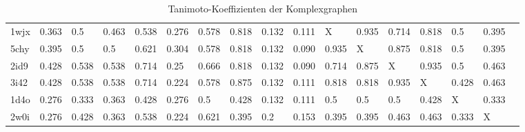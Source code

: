 \documentclass{report}
\begin{document}
\begin{table}
{\begin{tabular}{l l l l l l l l l l l l l l l l l}
1wjx & 0.363 & 0.5 & 0.463 & 0.538 & 0.276 & 0.578 & \cellcolor{fGreen!50}0.818 & 0.132 & 0.111 &   X   & \cellcolor{fGreen!100}0.935 & \cellcolor{fGreen!25}0.714 & \cellcolor{fGreen!75}0.818 & 0.5 & 0.395 &  \\
5chy & 0.395 & 0.5 & 0.5 & 0.621 & 0.304 & 0.578 & \cellcolor{fGreen!25}0.818 & 0.132 & 0.090 & \cellcolor{fGreen!100}0.935 &   X   & \cellcolor{fGreen!75}0.875 & \cellcolor{fGreen!50}0.818 & 0.5 & 0.395 &  \\
2id9 & 0.428 & 0.538 & 0.538 & 0.714 & 0.25 & 0.666 & \cellcolor{fGreen!50}0.818 & 0.132 & 0.090 & \cellcolor{fGreen!25}0.714 & \cellcolor{fGreen!75}0.875 &   X   & \cellcolor{fGreen!100}0.935 & 0.5 & 0.463 &  \\
3i42 & 0.428 & 0.538 & 0.538 & 0.714 & 0.224 & 0.578 & \cellcolor{fGreen!75}0.875 & 0.132 & 0.111 & \cellcolor{fGreen!25}0.818 & \cellcolor{fGreen!50}0.818 & \cellcolor{fGreen!100}0.935 &   X   & 0.428 & 0.463 &  \\
1d4o & 0.276 & 0.333 & 0.363 & 0.428 & 0.276 & \cellcolor{fGreen!100}0.5 & 0.428 & 0.132 & 0.111 & \cellcolor{fGreen!50}0.5 & \cellcolor{fGreen!25}0.5 & \cellcolor{fGreen!75}0.5 & 0.428 &   X   & 0.333 &  \\
2w0i & 0.276 & 0.428 & 0.363 & \cellcolor{fGreen!75}0.538 & 0.224 & \cellcolor{fGreen!100}0.621 & 0.395 & 0.2 & 0.153 & 0.395 & 0.395 & \cellcolor{fGreen!25}0.463 & \cellcolor{fGreen!50}0.463 & 0.333 &   X   &  \\

\end{tabular}}
\caption{Tanimoto-Koeffizienten der Komplexgraphen}
\end{table}












\end{document}
